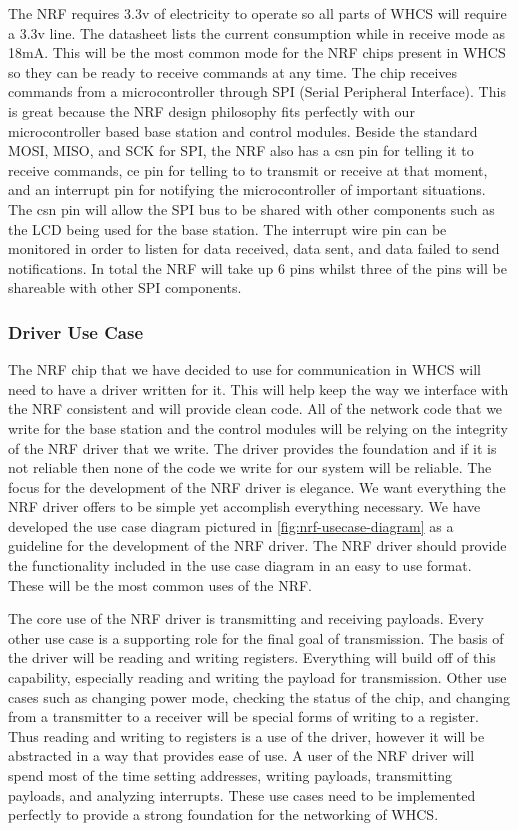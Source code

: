 The NRF requires 3.3v of electricity to operate so all parts of WHCS will
require a 3.3v line. The datasheet lists the current consumption while in
receive mode as 18mA. This will be the most common mode for the NRF chips
present in WHCS so they can be ready to receive commands at any time. The chip
receives commands from a microcontroller through SPI (Serial Peripheral
Interface). This is great because the NRF design philosophy fits perfectly with
our microcontroller based base station and control modules. Beside the standard
MOSI, MISO, and SCK for SPI, the NRF also has a csn pin for telling it to
receive commands, ce pin for telling to to transmit or receive at that moment,
and an interrupt pin for notifying the microcontroller of important situations.
The csn pin will allow the SPI bus to be shared with other components such as
the LCD being used for the base station. The interrupt wire pin can be
monitored in order to listen for data received, data sent, and data failed to
send notifications. In total the NRF will take up 6 pins whilst three of the
pins will be shareable with other SPI components.

\subsubsection{Driver Use Case}
The NRF chip that we have decided to use for communication in WHCS will need to
have a driver written for it. This will help keep the way we interface with the
NRF consistent and will provide clean code. All of the network code that we
write for the base station and the control modules will be relying on the
integrity of the NRF driver that we write.  The driver provides the foundation
and if it is not reliable then none of the code we write for our system will be
reliable. The focus for the development of the NRF driver is elegance. We want
everything the NRF driver offers to be simple yet accomplish everything
necessary. We have developed the use case diagram pictured in
\autoref{fig:nrf-usecase-diagram} as a guideline for the development of the NRF
driver. The NRF driver should provide the functionality included in the use
case diagram in an easy to use format.  These will be the most common uses of
the NRF.


The core use of the NRF driver is transmitting and receiving payloads. Every
other use case is a supporting role for the final goal of transmission. The
basis of the driver will be reading and writing registers. Everything will
build off of this capability, especially reading and writing the payload for
transmission. Other use cases such as changing power mode, checking the status
of the chip, and changing from a transmitter to a receiver will be special
forms of writing to a register. Thus reading and writing to registers is a use
of the driver, however it will be abstracted in a way that provides ease of
use. A user of the NRF driver will spend most of the time setting addresses,
writing payloads, transmitting payloads, and analyzing interrupts. These use
cases need to be implemented perfectly to provide a strong foundation for the
networking of WHCS.

